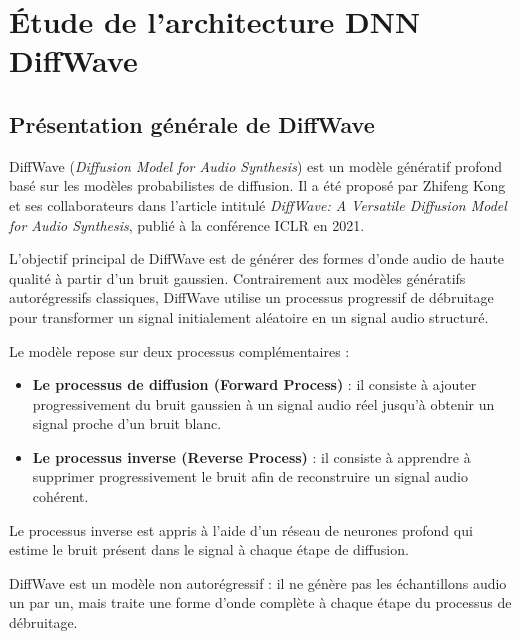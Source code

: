 

\section{Étude de l'architecture DNN DiffWave}

\subsection{Présentation générale de DiffWave}

DiffWave (\textit{Diffusion Model for Audio Synthesis}) est un
modèle génératif profond basé sur les modèles probabilistes
de diffusion. Il a été proposé par Zhifeng Kong et ses
collaborateurs dans l'article intitulé
\textit{DiffWave: A Versatile Diffusion Model for Audio Synthesis},
publié à la conférence ICLR en 2021.

L'objectif principal de DiffWave est de générer des formes
d'onde audio de haute qualité à partir d'un bruit gaussien.
Contrairement aux modèles génératifs autorégressifs classiques,
DiffWave utilise un processus progressif de débruitage pour
transformer un signal initialement aléatoire en un signal audio
structuré.

Le modèle repose sur deux processus complémentaires :

\begin{itemize}
    \item \textbf{Le processus de diffusion (Forward Process)} :
    il consiste à ajouter progressivement du bruit gaussien
    à un signal audio réel jusqu'à obtenir un signal proche
    d'un bruit blanc.

    \item \textbf{Le processus inverse (Reverse Process)} :
    il consiste à apprendre à supprimer progressivement
    le bruit afin de reconstruire un signal audio cohérent.
\end{itemize}

Le processus inverse est appris à l'aide d'un réseau de
neurones profond qui estime le bruit présent dans le signal
à chaque étape de diffusion.

DiffWave est un modèle non autorégressif : il ne génère pas
les échantillons audio un par un, mais traite une forme
d'onde complète à chaque étape du processus de débruitage.

